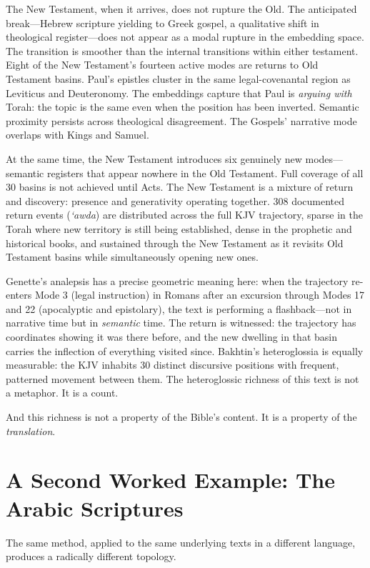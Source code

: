 The New Testament, when it arrives, does not rupture the Old. The anticipated break---Hebrew scripture yielding to Greek gospel, a qualitative shift in theological register---does not appear as a modal rupture in the embedding space. The transition is smoother than the internal transitions within either testament. Eight of the New Testament's fourteen active modes are returns to Old Testament basins. Paul's epistles cluster in the same legal-covenantal region as Leviticus and Deuteronomy. The embeddings capture that Paul is \emph{arguing with} Torah: the topic is the same even when the position has been inverted. Semantic proximity persists across theological disagreement. The Gospels' narrative mode overlaps with Kings and Samuel.

At the same time, the New Testament introduces six genuinely new modes---semantic registers that appear nowhere in the Old Testament. Full coverage of all 30 basins is not achieved until Acts. The New Testament is a mixture of return and discovery: presence and generativity operating together. 308 documented return events (\emph{`awda}) are distributed across the full KJV trajectory, sparse in the Torah where new territory is still being established, dense in the prophetic and historical books, and sustained through the New Testament as it revisits Old Testament basins while simultaneously opening new ones.

Genette's analepsis has a precise geometric meaning here: when the trajectory re-enters Mode 3 (legal instruction) in Romans after an excursion through Modes 17 and 22 (apocalyptic and epistolary), the text is performing a flashback---not in narrative time but in \emph{semantic} time. The return is witnessed: the trajectory has coordinates showing it was there before, and the new dwelling in that basin carries the inflection of everything visited since. Bakhtin's heteroglossia is equally measurable: the KJV inhabits 30 distinct discursive positions with frequent, patterned movement between them. The heteroglossic richness of this text is not a metaphor. It is a count.

And this richness is not a property of the Bible's content. It is a property of the \emph{translation}.


\section{A Second Worked Example: The Arabic Scriptures}

The same method, applied to the same underlying texts in a different language, produces a radically different topology.

